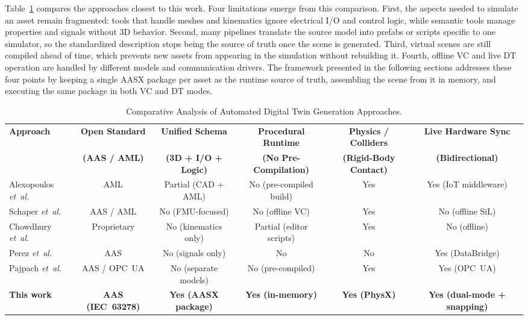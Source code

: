 \documentclass{ieeeojies}
\newcommand{\etal}{\textit{et~al.}}
\begin{document}
Table~\ref{tab:sota_comparison} compares the approaches closest to this work. Four limitations emerge from this comparison. First, the aspects needed to simulate an asset remain fragmented: tools that handle meshes and kinematics ignore electrical I/O and control logic, while semantic tools manage properties and signals without 3D behavior. Second, many pipelines translate the source model into prefabs or scripts specific to one simulator, so the standardized description stops being the source of truth once the scene is generated. Third, virtual scenes are still compiled ahead of time, which prevents new assets from appearing in the simulation without rebuilding it. Fourth, offline VC and live DT operation are handled by different models and communication drivers. The framework presented in the following sections addresses these four points by keeping a single AASX package per asset as the runtime source of truth, assembling the scene from it in memory, and executing the same package in both VC and DT modes.

\begin{table}[t]
\centering
\caption{Comparative Analysis of Automated Digital Twin Generation Approaches.}
\label{tab:sota_comparison}
\renewcommand{\arraystretch}{1.2}
\setlength{\tabcolsep}{4.5pt}
\begin{tabularx}{\textwidth}{@{}lccccc@{}}
\toprule
\textbf{Approach} & \textbf{Open Standard} & \textbf{Unified Schema} & \textbf{Procedural Runtime} & \textbf{Physics / Colliders} & \textbf{Live Hardware Sync} \\
& \textbf{(AAS / AML)} & \textbf{(3D + I/O + Logic)} & \textbf{(No Pre-Compilation)} & \textbf{(Rigid-Body Contact)} & \textbf{(Bidirectional)} \\
\midrule
Alexopoulos \etal \cite{Alexopoulos2025} & AML & Partial (CAD + AML) & No (pre-compiled build) & Yes & Yes (IoT middleware) \\
Schaper \etal \cite{Schaper2025} & AAS / AML & No (FMU-focused) & No (offline VC) & Yes & No (offline SiL) \\
Chowdhury \etal \cite{Chowdhury2025} & Proprietary & No (kinematics only) & Partial (editor scripts) & Yes & No (offline) \\
Perez \etal \cite{Perez2025} & AAS & No (signals only) & No & No & Yes (DataBridge) \\
Pajpach \etal \cite{Pajpach2023} & AAS / OPC~UA & No (separate models) & No (pre-compiled) & Yes & Yes (OPC~UA) \\
\midrule
\textbf{This work} & \textbf{AAS (IEC~63278)} & \textbf{Yes (AASX package)} & \textbf{Yes (in-memory)} & \textbf{Yes (PhysX)} & \textbf{Yes (dual-mode + snapping)} \\
\bottomrule
\end{tabularx}
\end{table}
\end{document}
